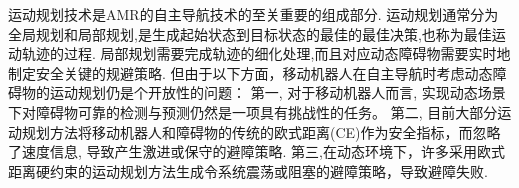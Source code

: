 \documentclass[preprint,5p,times,twocolumn]{elsarticle}
\begin{document}
运动规划技术是AMR的自主导航技术的至关重要的组成部分\citep{schwarting2018planningAD}.
运动规划通常分为全局规划和局部规划,是生成起始状态到目标状态的最佳的最佳决策,也称为最佳运动轨迹的过程\citep{Han2022AnES}.
局部规划需要完成轨迹的细化处理,而且对应动态障碍物需要实时地制定安全关键的规避策略\citep{Zhou2020EGOPlannerAE,Annaswamy2024ControlFS}.
但由于以下方面，移动机器人在自主导航时考虑动态障碍物的运动规划仍是个开放性的问题：
第一, 对于移动机器人而言, 实现动态场景下对障碍物可靠的检测与预测仍然是一项具有挑战性的任务\citep{Xu2022ARD, schmid2023dynabloxRD}。
第二, 目前大部分运动规划方法将移动机器人和障碍物的传统的欧式距离(CE)作为安全指标，而忽略了速度信息, 导致产生激进或保守的避障策略\citep{Chen2022RealtimeIA}.
第三,在动态环境下，许多采用欧式距离硬约束的运动规划方法生成令系统震荡或阻塞的避障策略，导致避障失败\citep{Chen2023RASTRS}.
\end{document}
